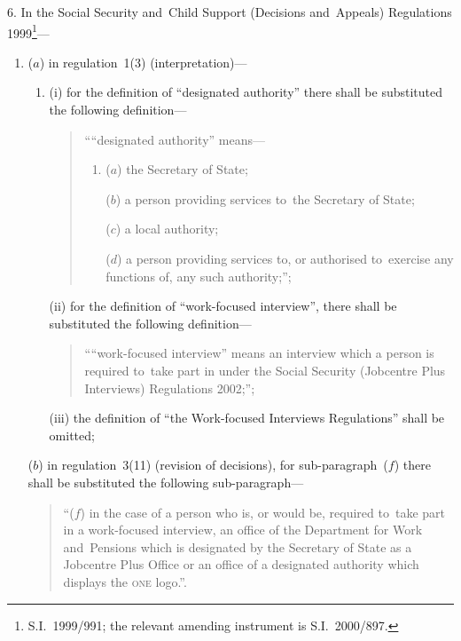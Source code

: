 \documentclass[12pt,a4paper]{article}
\begin{document}
\medskip 

6.  In the Social Security and~Child Support (Decisions and~Appeals) Regulations 1999\footnote{S.I.~1999/991; the relevant amending instrument is S.I.~2000/897.}—
\begin{enumerate}\item[]
($a$) in regulation~1(3) (interpretation)—
\begin{enumerate}\item[]
(i) for the definition of “designated authority” there shall be substituted the following definition—
\begin{quotation}
    ““designated authority” means—
\begin{enumerate}\item[]
    ($a$)     the Secretary of State;

    ($b$) 
    a person providing services to~the Secretary of State;

    ($c$) 
    a local authority;

    ($d$) 
    a person providing services to, or authorised to~exercise any functions of, any such authority;”; 
\end{enumerate}
\end{quotation}

(ii) for the definition of “work-focused interview”, there shall be substituted the following definition—
\begin{quotation}
““work-focused interview” means an interview which a person is required to~take part in under the Social Security (Jobcentre Plus Interviews) Regulations 2002;”;
\end{quotation}

(iii) the definition of “the Work-focused Interviews Regulations” shall be omitted;
\end{enumerate}

($b$) in regulation~3(11) (revision of decisions), for sub-paragraph~($f$)  there shall be substituted the following sub-paragraph—
\begin{quotation}
“($f$) in the case of a person who is, or would be, required to~take part in a work-focused interview, an office of the Department for Work and~Pensions which is designated by the Secretary of State as a Jobcentre Plus Office or an office of a designated authority which displays the \textsc{\lowercase{ONE}} logo.”.
\end{quotation}
\end{enumerate}

\medskip
\end{document}
